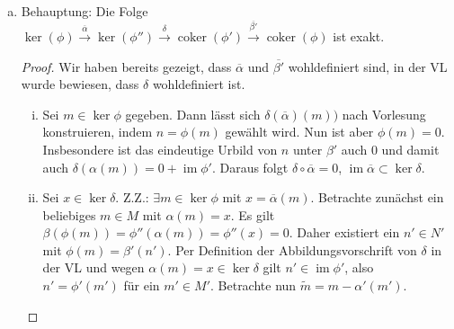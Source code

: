 \documentclass{article}
\newcommand{\im}{\operatorname{im}}
\newcommand{\coker}{\operatorname{coker}}
\begin{document}
\begin{enumerate}[(a)]
\begin{proof}
\begin{enumerate}[(i)]
\[            \]
            Da die mittlere Zeile exakt ist, $\ker \beta = \im \beta'$ existiert ein $x_4 \in N'$ mit $\beta'(x_4) = x_0 - \phi(x_2)$.
            Sei nun $y = \pi'(x_4) \in \coker \phi'$. Dann folgt mit Linearität der Abbildungen und Kommutativität des Diagramms
            \[ 
                \overline{\beta'}(y) = \overline{\beta'}(\pi'(x_4)) = \pi(\beta'(x_4)) = \pi(x_0 - \phi(x_2)) = \pi(x_0) - \underbrace{\pi\circ \phi}_{=0}(x_2) = \pi(x_0) = x
            \]
            Für ein beliebiges $x \in \ker \overline{\beta}$ existiert also ein $y \in \coker \phi'$ mit $\overline{\beta'}(y) = x$,
            also $\ker \overline{\beta} \subset \im \overline{\beta'}$.
        \end{enumerate}
        Insgesamt folgt $\ker \overline{\beta} = \im \overline{\beta'}$.
    \end{proof}
    \item Behauptung: Die Folge $\ker(\phi) \xrightarrow{\overline{\alpha}} \ker(\phi'') \xrightarrow{\delta} \coker(\phi') \xrightarrow{\overline{\beta'}} \coker(\phi)$ ist exakt.
    \begin{proof}
        Wir haben bereits gezeigt, dass $\overline{\alpha}$ und $\overline{\beta'}$ wohldefiniert sind, in der VL wurde bewiesen, dass $\delta$ wohldefiniert ist.
        \begin{enumerate}[(i)]
            \item Sei $m \in \ker \phi$ gegeben. Dann lässt sich $\delta(\overline{\alpha})(m))$ nach Vorlesung konstruieren, indem $n = \phi(m)$ gewählt wird.
            Nun ist aber $\phi(m) = 0$. Insbesondere ist das eindeutige Urbild von $n$ unter $\beta'$ auch $0$ und damit auch $\delta(\alpha(m)) = 0 + \im \phi'$.
            Daraus folgt $\delta \circ \overline{\alpha} = 0$, $\im \overline{\alpha} \subset \ker \delta$.
            \item Sei $x \in \ker \delta$. Z.Z.: $\exists m \in \ker \phi$ mit $x = \overline{\alpha}(m)$. 
            Betrachte zunächst ein beliebiges $m\in M$ mit $\alpha(m) = x$. Es gilt $\beta(\phi(m)) = \phi''(\alpha(m)) = \phi''(x) = 0$. 
            Daher existiert ein $n' \in N'$ mit $\phi(m) = \beta'(n')$. 
            Per Definition der Abbildungsvorschrift von $\delta$ in der VL und wegen $\alpha(m) = x \in \ker \delta$ gilt $n' \in \im \phi'$,
            also $n' = \phi'(m')$ für ein $m' \in M'$. Betrachte nun $\tilde m = m - \alpha'(m')$.

\end{enumerate}
\end{proof}
\end{enumerate}
\end{document}
